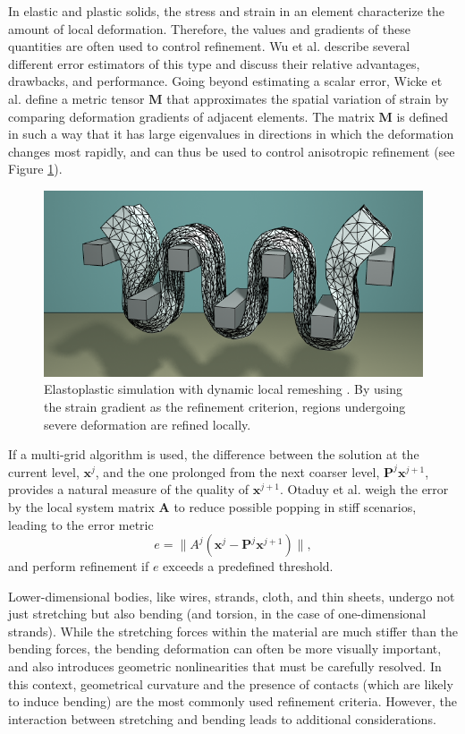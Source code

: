 In elastic and plastic solids, the stress and strain in an element characterize the amount of local deformation.
Therefore, the values and gradients of these quantities are often used to control refinement.
Wu et al. \cite{Wu2001} describe several different error estimators of this type and discuss their relative advantages, drawbacks, and performance.
Going beyond estimating a scalar error, Wicke et al. \cite{Wicke2010} define a metric tensor $\mathbf M$ that approximates the spatial variation of strain by comparing deformation gradients of adjacent elements.
The matrix $\mathbf M$ is defined in such a way that it has large eigenvalues in directions in which the deformation changes most rapidly, and can thus be used to control anisotropic refinement (see Figure \ref{fig:Wicke2010}).

\begin{figure}[t]
  \centering
  \includegraphics[width=0.8\linewidth]{images/starAdaptivity-cgf2016/mesh-plastic.png}
  \caption[STAR adaptivity: Tetrahedral remeshing]{Elastoplastic simulation with dynamic local remeshing \cite{Wicke2010}. By using the strain gradient as the refinement criterion, regions undergoing severe deformation are refined locally.}
  \label{fig:Wicke2010}
\end{figure}

If a multi-grid algorithm is used, the difference between the solution at the current level, $\mathbf x^j$, and the one prolonged from the next coarser level, $\mathbf P^j\mathbf x^{j+1}$, provides a natural measure of the quality of $\mathbf x^{j+1}$.
Otaduy et al. \cite{Otaduy2007} weigh the error by the local system matrix $\mathbf A$ to reduce possible popping in stiff scenarios, leading to the error metric
\begin{equation}
	e = \|A^j(\mathbf x^j-\mathbf P^j\mathbf x^{j+1})\|,
\end{equation}
and perform refinement if $e$ exceeds a predefined threshold.

Lower-dimensional bodies, like wires, strands, cloth, and thin sheets, undergo not just stretching but also bending (and torsion, in the case of one-dimensional strands).
While the stretching forces within the material are much stiffer than the bending forces, the bending deformation can often be more visually important, and also introduces geometric nonlinearities that must be carefully resolved.
In this context, geometrical curvature and the presence of contacts (which are likely to induce bending) are the most commonly used refinement criteria.
However, the interaction between stretching and bending leads to additional considerations.


